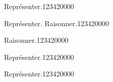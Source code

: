 \begin{pageParcourst}

\begin{ExoCt}{Représenter.}{1234}{2}{0}{0}{0}{0}

 

\end{ExoCt}

\begin{ExoCt}{Représenter. Raisonner.}{1234}{2}{0}{0}{0}{0}
 
 


\end{ExoCt}


\begin{ExoCt}{Raisonner.}{1234}{2}{0}{0}{0}{0}
 
\end{ExoCt}

\begin{ExoCt}{Représenter.}{1234}{2}{0}{0}{0}{0}

 

\end{ExoCt}

\begin{ExoCt}{Représenter.}{1234}{2}{0}{0}{0}{0}

 

\end{ExoCt} 
 
\end{pageParcourst}



\begin{pageBrouillon} 
 



\end{pageBrouillon}



